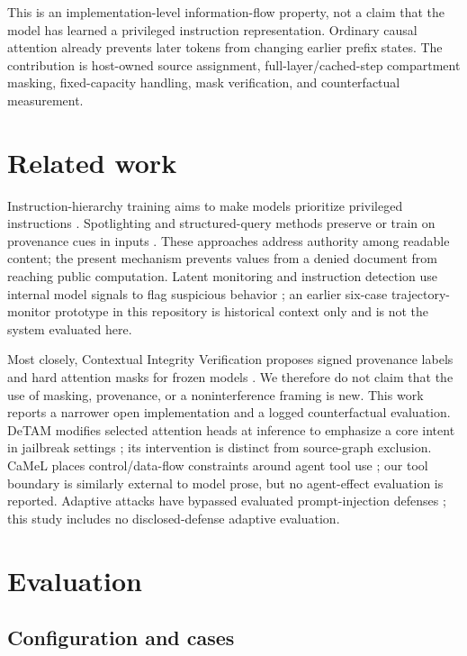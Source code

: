 \documentclass[11pt]{article}
\begin{document}
This is an implementation-level information-flow property, not a claim that the model has learned a privileged instruction representation. Ordinary causal attention already prevents later tokens from changing earlier prefix states. The contribution is host-owned source assignment, full-layer/cached-step compartment masking, fixed-capacity handling, mask verification, and counterfactual measurement.

\section{Related work}

Instruction-hierarchy training aims to make models prioritize privileged instructions \citep{wallace2024hierarchy}. Spotlighting and structured-query methods preserve or train on provenance cues in inputs \citep{hines2024spotlighting,chen2025struq}. These approaches address authority among readable content; the present mechanism prevents values from a denied document from reaching public computation. Latent monitoring and instruction detection use internal model signals to flag suspicious behavior \citep{hung2025attention,wen2025instructdetector}; an earlier six-case trajectory-monitor prototype in this repository is historical context only and is not the system evaluated here.

Most closely, Contextual Integrity Verification proposes signed provenance labels and hard attention masks for frozen models \citep{gupta2025civ}. We therefore do not claim that the use of masking, provenance, or a noninterference framing is new. This work reports a narrower open implementation and a logged counterfactual evaluation. DeTAM modifies selected attention heads at inference to emphasize a core intent in jailbreak settings \citep{li2025detam}; its intervention is distinct from source-graph exclusion. CaMeL places control/data-flow constraints around agent tool use \citep{debenedetti2025camel}; our tool boundary is similarly external to model prose, but no agent-effect evaluation is reported. Adaptive attacks have bypassed evaluated prompt-injection defenses \citep{zhan2025adaptive}; this study includes no disclosed-defense adaptive evaluation.

\section{Evaluation}

\subsection{Configuration and cases}
\end{document}
